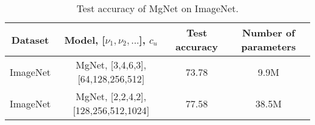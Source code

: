 \begin{table}[!htbp]
	\begin{center}
		\begin{tabular}{|c|c|c|c|}
			\hline
			Dataset     & Model, [$\nu_1,\nu_2,...$], $c_u$                  &  Test accuracy   &  Number of parameters \tabularnewline
			\hline
			ImageNet     &MgNet, [3,4,6,3], [64,128,256,512]          &  73.78      &   9.9M      \tabularnewline
			\hline
			ImageNet     &MgNet, [2,2,4,2], [128,256,512,1024]        &  77.58      &   38.5M      \tabularnewline
			\hline
		\end{tabular}
	\end{center}
\label{tab:MgNet-ImageNet-Results}
\caption{Test accuracy of MgNet on ImageNet.}
\end{table}
